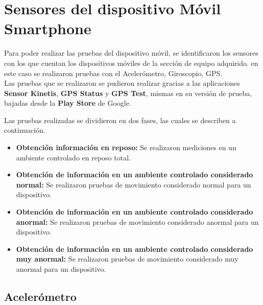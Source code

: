 
\section{Sensores del dispositivo Móvil Smartphone}
Para poder realizar las pruebas del dispositivo móvil, se identificaron los sensores con los que cuentan los dispositivos móviles de la sección de equipo adquirido. en este caso se realizaron pruebas con el Acelerómetro, Giroscopio, GPS.\\

Las pruebas que se realizaron se pudieron realizar gracias a las aplicaciones \textbf{Sensor Kinetis}, \textbf{GPS Status} y \textbf{GPS Test}, mismas en su versión de prueba, bajadas desde la \textbf{Play Store} de Google.

Las pruebas realizadas se dividieron en dos fases, las cuales se describen a continuación.

\begin{itemize}
	\item \textbf{Obtención información en reposo:} Se realizaron mediciones en un ambiente controlado en reposo total.
	
	\item \textbf{Obtención de información en un ambiente controlado considerado normal:} Se realizaron pruebas de movimiento considerado normal para un dispositivo.
	
	\item \textbf{Obtención de información en un ambiente controlado considerado anormal:}  Se realizaron pruebas de movimiento considerado anormal para un dispositivo.
	
	\item \textbf{Obtención de información en un ambiente controlado considerado muy anormal:}  Se realizaron pruebas de movimiento considerado muy anormal para un dispositivo.
\end{itemize}
\newpage
\subsection{Acelerómetro}
